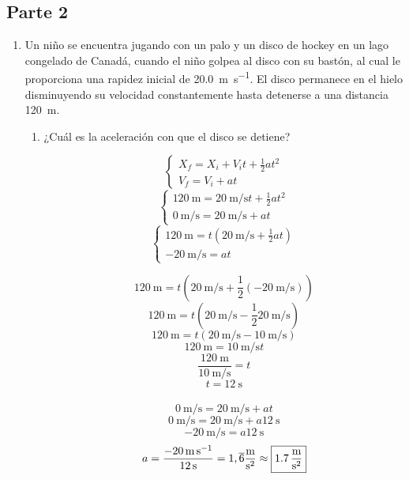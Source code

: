 \documentclass[Física - Práctica.root.tex]{subfiles}
\begin{document}
\subsection{Parte 2}
\begin{enumerate}
  \item Un niño se encuentra jugando con un palo y un disco de hockey en un lago congelado de
        Canadá, cuando el niño golpea al disco con su bastón, al cual le proporciona una rapidez
        inicial de \SI{20,0}{\meter\per\second}. El disco permanece en el hielo disminuyendo su velocidad
        constantemente hasta detenerse a una distancia \SI{120}{\meter}.
        \begin{enumerate}
          \item ¿Cuál es la aceleración con que el disco se detiene?

                \[
                  \begin{cases}
                    X_f = X_i + V_it + \frac{1}{2}at^2
                    \\
                    V_f = V_i + at
                  \end{cases}
                \]\[
                  \begin{cases}
                    \SI{120}{\meter} = \SI{20}{\meter\per\second}t + \frac{1}{2}at^2
                    \\
                    \SI{0}{\meter\per\second} = \SI{20}{\meter\per\second} + at
                  \end{cases}
                \]\[
                  \begin{cases}
                    \SI{120}{\meter} = t(\SI{20}{\meter\per\second} + \frac{1}{2}at)
                    \\
                    -\SI{20}{\meter\per\second} = at
                  \end{cases}
                \]

                \[ \SI{120}{\meter} = t(\SI{20}{\meter\per\second} + \frac{1}{2}(-\SI{20}{\meter\per\second})) \]
                \[ \SI{120}{\meter} = t(\SI{20}{\meter\per\second} - \frac{1}{2}\SI{20}{\meter\per\second}) \]
                \[ \SI{120}{\meter} = t(\SI{20}{\meter\per\second} - \SI{10}{\meter\per\second}) \]
                \[ \SI{120}{\meter} = \SI{10}{\meter\per\second}t \]
                \[ \frac{\SI{120}{\meter}}{\SI{10}{\meter\per\second}} = t \]
                \[ t = \SI{12}{\second} \]
                \\
                \[ \SI{0}{\meter\per\second} = \SI{20}{\meter\per\second} + at \]
                \[ \SI{0}{\meter\per\second} = \SI{20}{\meter\per\second} + a\SI{12}{\second} \]
                \[ -\SI{20}{\meter\per\second} = a\SI{12}{\second} \]
                \[ a
                  = \frac{-\SI{20}{\meter\per\second}}{\SI{12}{\second}}
                  = 1,\overline{6}\si[per-mode=fraction]{\meter\per\second\squared}
                  \approx \boxed{\SI[per-mode=fraction]{1,7}{\meter\per\second\squared}}
                \]


\end{enumerate}
\end{enumerate}
\end{document}
